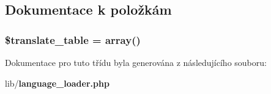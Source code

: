 \subsection{Dokumentace k položkám}
\subsubsection[{\$translate\_\-table}]{\setlength{\rightskip}{0pt plus 5cm}\$translate\_\-table = array()\hspace{0.3cm}{\ttfamily  [static, private]}}\label{d6/db2/class_language_loader_ad602aa38dcff173c9b644577d291a1d1}


Dokumentace pro tuto třídu byla generována z následujícího souboru:\begin{DoxyCompactItemize}
\item 
lib/{\bf language\_\-loader.php}\end{DoxyCompactItemize}
